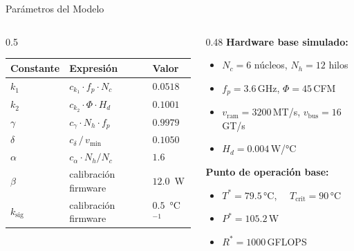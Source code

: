 \documentclass[aspectratio=169, 10pt]{beamer}
\begin{document}
\begin{frame}{Parámetros del Modelo}
  \begin{columns}[c]
    \begin{column}{0.5\textwidth}
      \small
      \begin{tabular}{@{}lll@{}}
        \toprule
        \textcolor{accent}{Constante} & \textcolor{accent}{Expresión} & \textcolor{accent}{Valor} \\
        \midrule
        $k_1$ & $c_{k_1}\cdot f_p \cdot N_c$      & $0.0518$ \\
        $k_2$ & $c_{k_2}\cdot \Phi \cdot H_d$      & $0.1001$ \\
        $\gamma$ & $c_\gamma\cdot N_h \cdot f_p$   & $0.9979$ \\
        $\delta$ & $c_\delta\,/\,v_{\min}$         & $0.1050$ \\
        $\alpha$ & $c_\alpha\cdot N_h/N_c$          & $1.6$ \\
        $\beta$  & calibración firmware             & $12.0$~W \\
        $k_{\text{sig}}$ & calibración firmware     & $0.5$~°C$^{-1}$ \\
        \bottomrule
      \end{tabular}
    \end{column}
    \begin{column}{0.48\textwidth}
      \small
      \textbf{Hardware base simulado:}
      \begin{itemize}\setlength\itemsep{2pt}
        \item $N_c=6$ núcleos, $N_h=12$ hilos
        \item $f_p=3.6$\,GHz, $\Phi=45$\,CFM
        \item $v_{\text{ram}}=3200$\,MT/s, $v_{\text{bus}}=16$\,GT/s
        \item $H_d=0.004$\,W/°C
      \end{itemize}
      \vspace{6pt}
      \textbf{Punto de operación base:}
      \begin{itemize}\setlength\itemsep{2pt}
        \item $T^*=79.5$\,°C, $\quad T_{\text{crit}}=90$\,°C
        \item $P^*=105.2$\,W
        \item $R^*=1000$\,GFLOPS
      \end{itemize}
    \end{column}
  \end{columns}
\end{frame}
\end{document}

